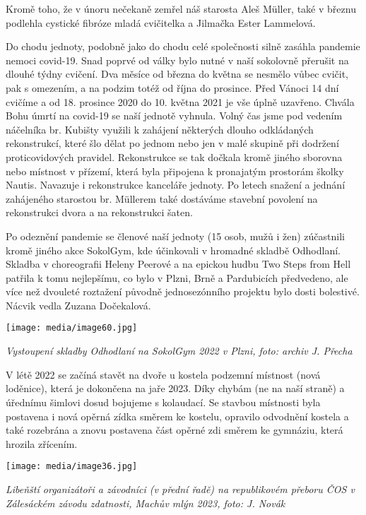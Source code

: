Kromě toho, že v únoru nečekaně zemřel náš starosta Aleš Müller, také v
březnu podlehla cystické fibróze mladá cvičitelka a Jilmačka Ester
Lammelová.

Do chodu jednoty, podobně jako do chodu celé společnosti silně zasáhla
pandemie nemoci covid-19. Snad poprvé od války bylo nutné v naší
sokolovně přerušit na dlouhé týdny cvičení. Dva měsíce od března do
května se nesmělo vůbec cvičit, pak s omezením, a na podzim totéž od
října do prosince. Před Vánoci 14 dní cvičíme a od 18. prosince 2020 do
10. května 2021 je vše úplně uzavřeno. Chvála Bohu úmrtí na covid-19 se
naší jednotě vyhnula. Volný čas jsme pod vedením náčelníka br. Kubišty
využili k zahájení některých dlouho odkládaných rekonstrukcí, které šlo
dělat po jednom nebo jen v malé skupině při dodržení proticovidových
pravidel. Rekonstrukce se tak dočkala kromě jiného sborovna nebo
místnost v přízemí, která byla připojena k pronajatým prostorám školky
Nautis. Navazuje i rekonstrukce kanceláře jednoty. Po letech snažení a
jednání zahájeného starostou br. Müllerem také dostáváme stavební
povolení na rekonstrukci dvora a na rekonstrukci šaten.

Po odeznění pandemie se členové naší jednoty (15 osob, mužů i žen)
zúčastnili kromě jiného akce SokolGym, kde účinkovali v hromadné skladbě
Odhodlaní. Skladba v choreografii Heleny Peerové a na epickou hudbu Two
Steps from Hell patřila k tomu nejlepšímu, co bylo v Plzni, Brně a
Pardubicích předvedeno, ale více než dvouleté roztažení původně
jednosezónního projektu bylo dosti bolestivé. Nácvik vedla Zuzana
Dočekalová.

\texttt{[image: media/image60.jpg]}

\emph{Vystoupení skladby Odhodlaní na SokolGym 2022 v Plzni, foto:
archiv J. Přecha}

V létě 2022 se začíná stavět na dvoře u kostela podzemní místnost (nová
loděnice), která je dokončena na jaře 2023. Díky chybám (ne na naší
straně) a úřednímu šimlovi dosud bojujeme s kolaudací. Se stavbou
místnosti byla postavena i nová opěrná zídka směrem ke kostelu, opravilo
odvodnění kostela a také rozebrána a znovu postavena část opěrné zdi
směrem ke gymnáziu, která hrozila zřícením.

\texttt{[image: media/image36.jpg]}

\emph{Libeňští organizátoři a závodníci (v přední řadě) na republikovém
přeboru ČOS v Zálesáckém závodu zdatnosti, Machův mlýn 2023, foto: J.
Novák}

